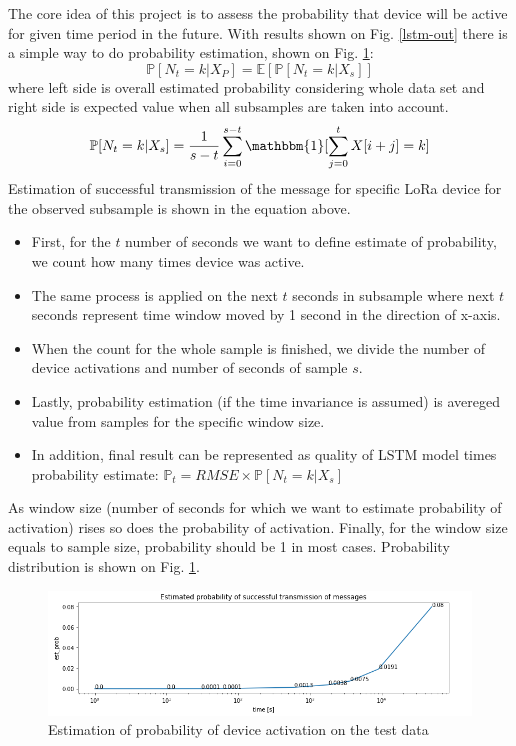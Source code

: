 \documentclass[11pt, a4paper]{article} %
\begin{document}
The core idea of this project is to assess the probability that device will be active for given time period in the future. 
With results shown on Fig. \ref{lstm-out} there is a simple way to do probability estimation, shown on Fig. \ref{est-prob}:
$$ \mathbb{P}[N_{t} = k | X_{P}] = \mathbb{E}[\mathbb{P}[N_{t} = k | X_{s}]] $$
where left side is overall estimated probability considering whole data set and right side is expected value when all subsamples are taken into account.
$$ \mathbb{P}[N_{t} = k | X_{s}] =  \frac{1}{s-t}  \sum_{i=0}^{s-t}\mathbbm{1}[\sum_{j=0}^{t}X[i+j]=k] $$
Estimation of successful transmission of the message for specific LoRa device for the observed subsample is shown in the equation above.
\begin{itemize}
	\item First, for the $ t $ number of seconds we want to define estimate of probability, we count how many times device was active.
	\item The same process is applied on the next $ t $ seconds in subsample where next $ t $ seconds represent time window moved by 1 second in the direction of x-axis.
	\item When the count for the whole sample is finished, we divide the number of device activations and number of seconds of sample $ s $. 
	\item Lastly, probability estimation (if the time invariance is assumed) is avereged value from samples for the specific window size.
	\item In addition, final result can be represented as quality of LSTM model times probability estimate: $ \mathbb{P}_{t} = RMSE \times \mathbb{P}[N_{t} = k | X_{s}] $ 
\end{itemize} 
As window size (number of seconds for which we want to estimate probability of activation) rises so does the probability of activation. Finally, for the window size equals to sample size, probability should be 1 in most cases. 
Probability distribution is shown on Fig. \ref{est-prob}.
\begin{figure}
	\centering
	\includegraphics[scale=.6]{images/est-prob.png} %
	\caption{Estimation of probability of device activation on the test data}
	\label{est-prob} 
\end{figure}
\end{document}

